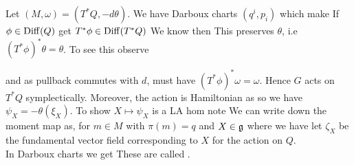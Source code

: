 \documentclass{article}
\begin{document}
\begin{example}
Let $(M, \omega) = (T^\ast Q, - d\theta)$. We have Darboux charts $(q^i,p_i)$ which make 
If $\phi \in \operatorname{Diff}(Q)$ get $T^\ast \phi \in \operatorname{Diff}(T^\ast Q)$
We know 
then 
This preserves $\theta$, i.e $(T^\ast \phi)^\ast \theta = \theta$. To see this observe 

and as pullback commutes with $d$, must have $(T^\ast \phi)^\ast \omega = \omega$. Hence $G$ acts on $T^\ast Q$ symplectically. Moreover, the action is Hamiltonian as 
so we have $\psi_X = -\theta(\xi_X)$. To show $X \mapsto \psi_X$ is a LA hom note 
We can write down the moment map as, for $m \in M$ with $\pi(m)=q$ and $X \in \mathfrak{g}$ 
where we have let $\zeta_X$ be the fundamental vector field corresponding to $X$ for the action on $Q$. \\
In Darboux charts we get 
These are called . 
\end{example}
\end{document}
